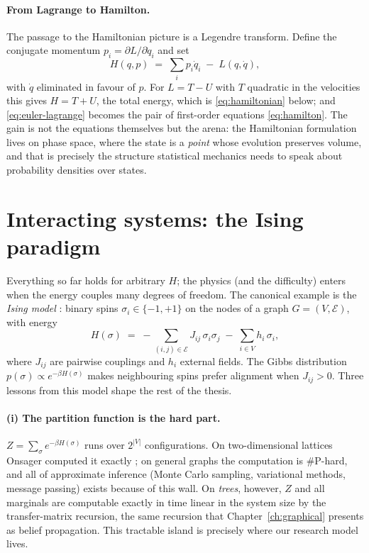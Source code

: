 \paragraph{From Lagrange to Hamilton.} The passage to the Hamiltonian
picture is a Legendre transform. Define the conjugate momentum
$p_i = \partial L/\partial \dot q_i$ and set
\begin{equation}
  H(q,p) \;=\; \sum_i p_i \dot q_i \;-\; L(q,\dot q),
  \label{eq:legendre}
\end{equation}
with $\dot q$ eliminated in favour of $p$. For $L = T - U$ with $T$ quadratic
in the velocities this gives $H = T + U$, the total energy, which is
\eqref{eq:hamiltonian} below; and \eqref{eq:euler-lagrange} becomes the pair
of first-order equations \eqref{eq:hamilton}. The gain is not the equations
themselves but the arena: the Hamiltonian formulation lives on phase space,
where the state is a \emph{point} whose evolution preserves volume, and that
is precisely the structure statistical mechanics needs to speak about
probability densities over states.

\section{Interacting systems: the Ising paradigm}\label{sec:ising}

Everything so far holds for arbitrary $H$; the physics (and the
difficulty) enters when the energy couples many degrees of freedom. The
canonical example is the \emph{Ising model} \citep{ising1925beitrag}:
binary spins $\sigma_i \in \{-1, +1\}$ on the nodes of a graph
$G = (V, \mathcal{E})$, with energy
\begin{equation}
  H(\sigma) \;=\; -\sum_{(i,j) \in \mathcal{E}} J_{ij}\, \sigma_i \sigma_j
  \;-\; \sum_{i \in V} h_i\, \sigma_i ,
  \label{eq:ising}
\end{equation}
where $J_{ij}$ are pairwise couplings and $h_i$ external fields. The
Gibbs distribution $p(\sigma) \propto e^{-\beta H(\sigma)}$ makes
neighbouring spins prefer alignment when $J_{ij} > 0$. Three lessons from
this model shape the rest of the thesis.

\paragraph{(i) The partition function is the hard part.}
$Z = \sum_\sigma e^{-\beta H(\sigma)}$ runs over $2^{|V|}$
configurations. On two-dimensional lattices Onsager computed it exactly
\citep{onsager1944crystal}; on general graphs the computation is
\#P-hard, and all of approximate inference (Monte Carlo sampling,
variational methods, message passing) exists because of this wall. On
\emph{trees}, however, $Z$ and all marginals are computable exactly in
time linear in the system size by the transfer-matrix recursion, the same
recursion that Chapter~\ref{ch:graphical} presents as belief propagation.
This tractable island is precisely where our research model lives.

